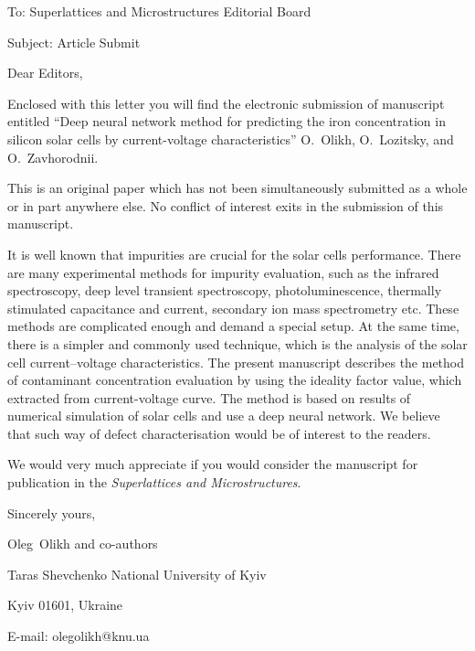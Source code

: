\documentclass[preprint]{elsarticle}
\begin{document}
To:
Superlattices and Microstructures Editorial Board


Subject:
Article Submit

\vspace{5mm}
Dear Editors,

\vspace{3mm}
Enclosed with this letter you will find the electronic submission of manuscript entitled
``Deep neural network method for predicting the iron concentration in silicon solar cells by current-voltage characteristics'' O.~Olikh, O.~Lozitsky, and O.~Zavhorodnii.



This is an original paper which has not been simultaneously submitted as a whole or in part anywhere else.
No conflict of interest exits in the submission of this manuscript.


It is well known that impurities are crucial for the solar cells performance.
There are many experimental methods for impurity evaluation, such as the infrared spectroscopy, deep level transient spectroscopy, photoluminescence, thermally stimulated capacitance and current, secondary ion mass spectrometry etc.
These methods are complicated enough and demand a special setup.
At the same time, there is a simpler and commonly used technique, which
is the analysis of the solar cell current--voltage characteristics.
The present manuscript describes the method of contaminant concentration evaluation by
using the ideality factor value, which extracted from current-voltage curve.
The method is based on results of numerical simulation of solar cells and use a deep neural network.
We believe that such way of defect characterisation would be of interest to the readers.

We would  very much appreciate if you would consider the manuscript for publication in the \emph{Superlattices and Microstructures}.

\vspace{3mm}

Sincerely yours,

Oleg~Olikh and co-authors


Taras Shevchenko National University of Kyiv


Kyiv 01601, Ukraine

E-mail: olegolikh@knu.ua


\end{document}
